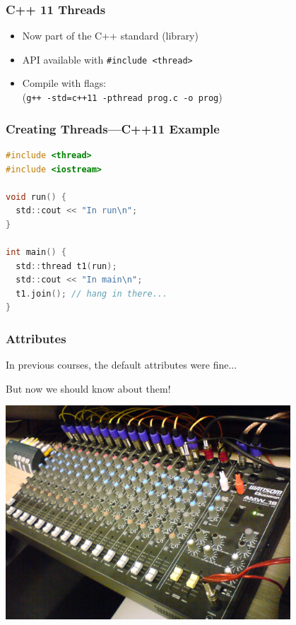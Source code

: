 
\begin{frame}[fragile]
  \frametitle{C++ 11 Threads}


  \begin{itemize}
    \item Now part of the C++ standard (library)
    \vfill
    \item API available with {\tt \#include <thread>}
    \vfill
    \item Compile with flags: \\ (\verb!g++ -std=c++11 -pthread prog.c -o prog!)
  \end{itemize}

\end{frame}

\begin{frame}[fragile]
  \frametitle{Creating Threads---C++11 Example}


\begin{lstlisting}[language=C]
#include <thread>
#include <iostream>

void run() {
  std::cout << "In run\n";
}

int main() {
  std::thread t1(run);
  std::cout << "In main\n";
  t1.join(); // hang in there...
}
\end{lstlisting}

\end{frame}


\begin{frame}
\frametitle{Attributes}

 In previous courses, the default attributes were fine...
 
 But now we should know about them!
 
 \begin{center}
 \includegraphics[width=0.8\textwidth]{images/mixing-console.jpg}
 \end{center}

\end{frame}



